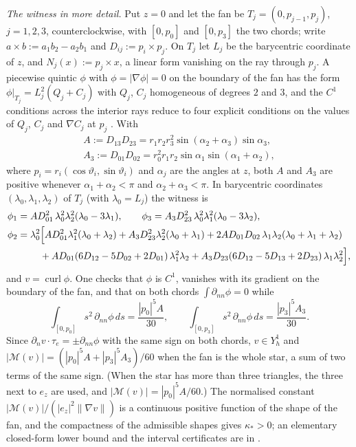 \documentclass[pdflatex,sn-mathphys-num]{sn-jnl}
\theoremstyle{thmstyleone}
\theoremstyle{thmstylethree}
\newcommand{\Yh}{Y_h}
\newcommand{\dn}{\partial_n}
\newcommand{\norm}[1]{\lVert #1\rVert}
\newcommand{\curl}{\operatorname{curl}}
\begin{document}
\emph{The witness in more detail.} Put $z=0$ and let the fan be $T_j=(0,p_{j-1},p_j)$, $j=1,2,3$, counterclockwise, with $[0,p_0]$ and $[0,p_3]$ the two chords; write $a\times b:=a_1b_2-a_2b_1$ and $D_{ij}:=p_i\times p_j$. On $T_j$ let $L_j$ be the barycentric coordinate of $z$, and $N_j(x):=p_j\times x$, a linear form vanishing on the ray through $p_j$. A piecewise quintic $\phi$ with $\phi=|\nabla\phi|=0$ on the boundary of the fan has the form $\phi|_{T_j}=L_j^2(Q_j+C_j)$ with $Q_j$, $C_j$ homogeneous of degrees $2$ and $3$, and the $C^1$ conditions across the interior rays reduce to four explicit conditions on the values of $Q_j$, $C_j$ and $\nabla C_j$ at $p_j$ \cite{PadhiExt}. With
\begin{gather*}
A:=D_{13}D_{23}=r_1r_2r_3^2\sin(\alpha_2+\alpha_3)\sin\alpha_3,\\
A_3:=D_{01}D_{02}=r_0^2r_1r_2\sin\alpha_1\sin(\alpha_1+\alpha_2),
\end{gather*}
where $p_i=r_i(\cos\vartheta_i,\sin\vartheta_i)$ and $\alpha_j$ are the angles at $z$, both $A$ and $A_3$ are positive whenever $\alpha_1+\alpha_2<\pi$ and $\alpha_2+\alpha_3<\pi$. In barycentric coordinates $(\lambda_0,\lambda_1,\lambda_2)$ of $T_j$ (with $\lambda_0=L_j$) the witness is
\begin{align*}
\phi_1&=AD_{01}^2\,\lambda_0^2\lambda_2^2(\lambda_0-3\lambda_1),\qquad \phi_3=A_3D_{23}^2\,\lambda_0^2\lambda_1^2(\lambda_0-3\lambda_2),\\
\phi_2&=\lambda_0^2\Bigl[AD_{01}^2\lambda_1^2(\lambda_0+\lambda_2)+A_3D_{23}^2\lambda_2^2(\lambda_0+\lambda_1)+2AD_{01}D_{02}\,\lambda_1\lambda_2(\lambda_0+\lambda_1+\lambda_2)\\
&\qquad\ +AD_{01}(6D_{12}-5D_{02}+2D_{01})\,\lambda_1^2\lambda_2+A_3D_{23}(6D_{12}-5D_{13}+2D_{23})\,\lambda_1\lambda_2^2\Bigr],
\end{align*}
and $v=\curl\phi$. One checks that $\phi$ is $C^1$, vanishes with its gradient on the boundary of the fan, and that on both chords $\int\partial_{nn}\phi=0$ while
\[
\int_{[0,p_0]}s^2\,\partial_{nn}\phi\,ds=\frac{|p_0|^5A}{30},\qquad \int_{[0,p_3]}s^2\,\partial_{nn}\phi\,ds=\frac{|p_3|^5A_3}{30}.
\]
Since $\dn v\cdot\tau_e=\pm\partial_{nn}\phi$ with the same sign on both chords, $v\in\Yh^1$ and $|\mathcal M(v)|=(|p_0|^5A+|p_3|^5A_3)/60$ when the fan is the whole star, a sum of two terms of the same sign. (When the star has more than three triangles, the three next to $e_z$ are used, and $|\mathcal M(v)|=|p_0|^5A/60$.) The normalised constant $|\mathcal M(v)|/(|e_z|^2\norm{\nabla v})$ is a continuous positive function of the shape of the fan, and the compactness of the admissible shapes gives $\kappa_\ast>0$; an elementary closed-form lower bound and the interval certificates are in \cite{PadhiExt}.
\end{document}
